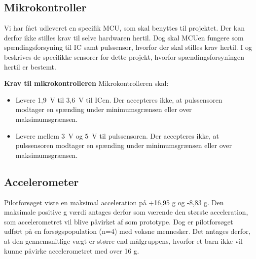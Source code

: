 \subsection{Mikrokontroller} \label{krav_mikro_spaending}
Vi har fået udleveret en specifik MCU, som skal benyttes til projektet. Der kan derfor ikke stilles krav til selve hardwaren hertil. Dog skal MCUen fungere som spændingsforsyning til IC samt pulssensor, hvorfor der skal stilles krav hertil. I  og  beskrives de specifikke sensorer for dette projekt, hvorfor spændingsforsyningen hertil er bestemt.

\textbf{Krav til mikrokontrolleren} \newline 
Mikrokontrolleren skal:
\begin{itemize}
	\item Levere 1,9~V til 3,6~V til ICen. Der accepteres ikke, at pulssensoren modtager en spænding under minimumsgrænsen eller over maksimumsgrænsen.
	\item Levere mellem 3~V og 5~V til pulssensoren. Der accepteres ikke, at pulssensoren modtager en spænding under minimumsgrænsen eller over maksimumsgrænsen.
\end{itemize}

\subsection{Accelerometer}
Pilotforsøget viste en maksimal acceleration på +16,95 g og -8,83 g. Den maksimale positive g værdi antages derfor som værende den største acceleration, som accelerometret vil blive påvirket af som prototype. Dog er pilotforsøget udført på en forsøgspopulation (n=4) med voksne mennesker. Det antages derfor, at den gennemsnitlige vægt er større end målgruppens, hvorfor et barn ikke vil kunne påvirke accelerometret med over 16 g. %

